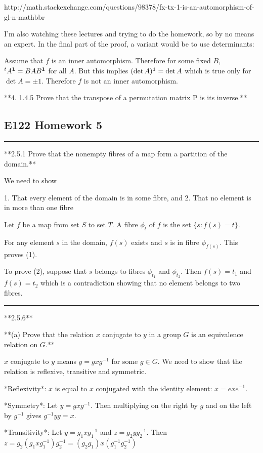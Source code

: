 http://math.stackexchange.com/questions/98378/fx-tx-1-is-an-automorphism-of-gl-n-mathbbr

I'm also watching these lectures and trying to do the homework, so by no means
an expert. In the final part of the proof, a variant would be to use
determinants:

Assume that $f$ is an inner automorphism. Therefore for some fixed $B$, $^tA^{\mathbf 1}
= BAB^{\mathbf 1}$ for all $A$. But this implies $(\det A)^{\mathbf 1} = \det A$ which is true
only for $\det A = \pm 1$. Therefore $f$ is not an inner automorphism.


**4. 1.4.5 Prove that the transpose of a permutation matrix P is its inverse.**

\subsection{E122 Homework 5}
\hrule

**2.5.1 Prove that the nonempty fibres of a map form a partition of the domain.**

We need to show

1. That every element of the domain is in some fibre, and
2. That no element is in more than one fibre

Let $f$ be a map from set $S$ to set $T$. A fibre $\phi_t$ of $f$ is the set
$\{s: f(s) = t\}$.

For any element $s$ in the domain, $f(s)$ exists and $s$ is in fibre
$\phi_{f(s)}$. This proves (1).

To prove (2), suppose that $s$ belongs to fibres $\phi_{t_1}$ and
$\phi_{t_2}$. Then $f(s) = t_1$ and $f(s) = t_2$ which is a contradiction
showing that no element belongs to two fibres.

\hrule

**2.5.6**

**(a) Prove that the relation $x$ conjugate to $y$ in a group $G$ is an
  equivalence relation on $G$.**

$x$ conjugate to $y$ means $y = gxg^{-1}$ for some $g \in G$. We need to show
that the relation is reflexive, transitive and symmetric.

*Reflexivity*: $x$ is equal to $x$ conjugated with the identity element: $x = exe^{-1}$.

*Symmetry*: Let $y = gxg^{-1}$. Then multiplying on the right by $g$ and on the
            left by $g^{-1}$ gives $g^{-1}yg = x$.

*Transitivity*: Let $y = g_1xg_1^{-1}$ and $z = g_2yg_2^{-1}$. Then $z =
                g_2(g_1xg_1^{-1})g_2^{-1} = (g_2g_1)x(g_1^{-1}g_2^{-1})$


